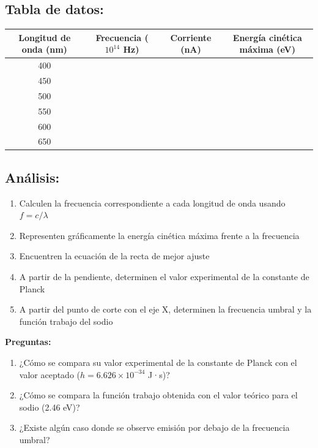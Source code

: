 \documentclass[12pt,a4paper]{article}
\begin{document}
	\subsection{Tabla de datos:}
	
	\begin{center}
		\begin{tabular}{|c|c|c|c|}
			\hline
			\textbf{Longitud de onda (nm)} & \textbf{Frecuencia ($10^{14}$ Hz)} & \textbf{Corriente (nA)} & \textbf{Energía cinética máxima (eV)} \\
			\hline
			400 & & & \\
			\hline
			450 & & & \\
			\hline
			500 & & & \\
			\hline
			550 & & & \\
			\hline
			600 & & & \\
			\hline
			650 & & & \\
			\hline
		\end{tabular}
	\end{center}
	
	\subsection{Análisis:}
	\begin{enumerate}
		\item Calculen la frecuencia correspondiente a cada longitud de onda usando $f = c/\lambda$
		\item Representen gráficamente la energía cinética máxima frente a la frecuencia
		\item Encuentren la ecuación de la recta de mejor ajuste
		\item A partir de la pendiente, determinen el valor experimental de la constante de Planck
		\item A partir del punto de corte con el eje X, determinen la frecuencia umbral y la función trabajo del sodio
	\end{enumerate}
	
	\begin{preguntabox}
		\textbf{Preguntas:}
		\begin{enumerate}
			\item ¿Cómo se compara su valor experimental de la constante de Planck con el valor aceptado ($h = 6.626 \times 10^{-34}$ J·s)?
			\item ¿Cómo se compara la función trabajo obtenida con el valor teórico para el sodio (2.46 eV)?
			\item ¿Existe algún caso donde se observe emisión por debajo de la frecuencia umbral?
		\end{enumerate}
	\end{preguntabox}
	
\end{document}
